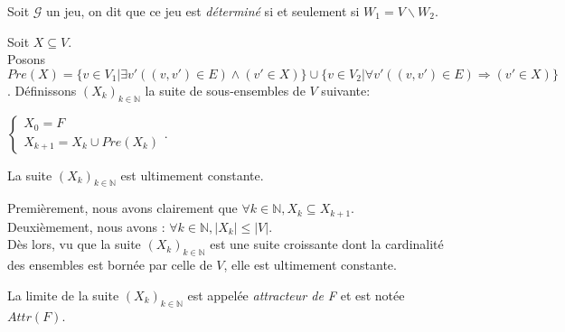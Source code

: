 	\begin{defi}
		Soit $\mathcal{G}$ un jeu, on dit que ce jeu est \textit{déterminé} si et seulement si $W_{1} = V \backslash W_{2}$.
	\end{defi}

	\begin{defi}
		\label{def:predecesseur}
		 Soit $X \subseteq V$.\\ 
		Posons $Pre(X) = \{ v \in V_{1}| \exists v'((v,v')\in E) \wedge (v' \in X)\} \cup \{ v \in V_{2}|\forall v' ((v,v')\in E) \Rightarrow (v' \in X)\}$.
		Définissons $(X_{k})_{k \in \mathbb{N}}$ la suite de sous-ensembles de $V$ suivante: \\
		\begin{center}
			$
			  \begin{cases}
			   X_{0} = F \\
			   X_{k+1} = X_{k} \cup Pre(X_{k})
		       \end{cases}
			. $
		\end{center}
		
	\end{defi}
	
	
	\begin{propriete}
		\label{prop:suiteUltConst}
		La suite $(X_{k})_{k \in \mathbb{N}}$ est ultimement constante. 
	\end{propriete}
	\begin{demonstration}
		Premièrement, nous avons clairement que  $\forall k \in \mathbb{N}, X_{k} \subseteq X_{k+1}$.\\
		Deuxièmement, nous avons : $\forall k \in \mathbb{N}, |X_{k}| \leq |V| $.\\
		Dès lors, vu que la suite $(X_{k})_{k \in \mathbb{N}}$ est une suite croissante dont la cardinalité des ensembles est bornée par celle de $V$, elle est ultimement constante.\\
		
	\end{demonstration}
	
	
	
	\begin{defi}
		La limite de la suite $(X_{k})_{k \in \mathbb{N}}$ est appelée \textit{attracteur de F} et est notée $Attr(F)$.
	\end{defi}
	

